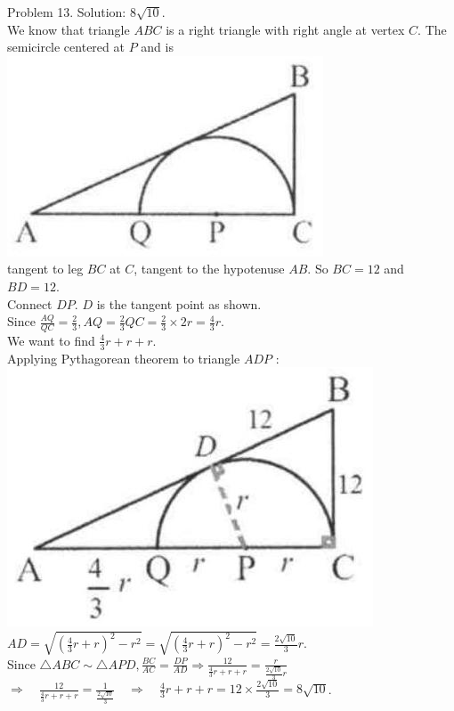 \documentclass[10pt]{article}
\begin{document}
Problem 13. Solution: \(8 \sqrt{10}\).\\
We know that triangle \(A B C\) is a right triangle with right angle at vertex \(C\). The semicircle centered at \(P\) and is\\
\includegraphics[max width=\textwidth, center]{2025_04_17_97bc1f7e44d93c271a88g-160(2)}\\
tangent to leg \(B C\) at \(C\), tangent to the hypotenuse \(A B\). So \(B C=12\) and \(B D=12\).\\
Connect \(D P\). \(D\) is the tangent point as shown.\\
Since \(\frac{A Q}{Q C}=\frac{2}{3}, A Q=\frac{2}{3} Q C=\frac{2}{3} \times 2 r=\frac{4}{3} r\).\\
We want to find \(\frac{4}{3} r+r+r\).\\
Applying Pythagorean theorem to triangle \(A D P\) :\\
\includegraphics[max width=\textwidth, center]{2025_04_17_97bc1f7e44d93c271a88g-161(1)}\\
\(A D=\sqrt{\left(\frac{4}{3} r+r\right)^{2}-r^{2}}=\sqrt{\left(\frac{4}{3} r+r\right)^{2}-r^{2}}=\frac{2 \sqrt{10}}{3} r\).\\
Since \(\triangle A B C \sim \triangle A P D, \frac{B C}{A C}=\frac{D P}{A D} \Rightarrow \frac{12}{\frac{4}{3} r+r+r}=\frac{r}{\frac{2 \sqrt{10}}{3} r}\)\\
\(\Rightarrow \quad \frac{12}{\frac{4}{3} r+r+r}=\frac{1}{\frac{2 \sqrt{10}}{3}} \quad \Rightarrow \quad \frac{4}{3} r+r+r=12 \times \frac{2 \sqrt{10}}{3}=8 \sqrt{10}\).
\end{document}
